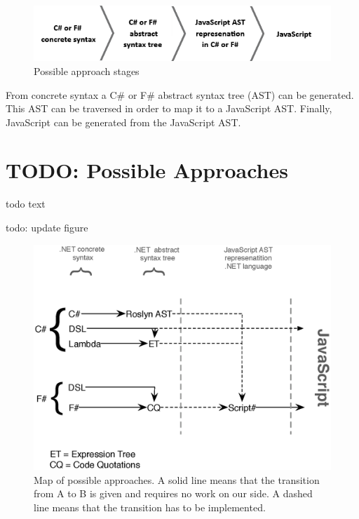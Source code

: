 				\begin{figure}[H]
			\begin{center}
				\centerline{\includegraphics[width=14cm]{resources/images/stages.png}}
			\end{center}
			\caption{Possible approach stages}
			\label{stages}
		\end{figure}

	 From concrete syntax a C\# or F\# abstract syntax tree (AST) can be generated. This AST can be traversed in order to map it to a JavaScript AST. Finally, JavaScript can be generated from the JavaScript AST.

\section{TODO: Possible Approaches} %
\label{sec:possible_approaches}
	todo text

	todo: update figure
					\begin{figure}[H]
			\begin{center}
				\centerline{\includegraphics[width=14cm]{resources/images/approachComparison.eps}}
			\end{center}
			\caption{Map of possible approaches. A solid line means that the transition from A to B is given and requires no work on our side. A dashed line means that the transition has to be implemented.}
			\label{approachMap}
		\end{figure}

